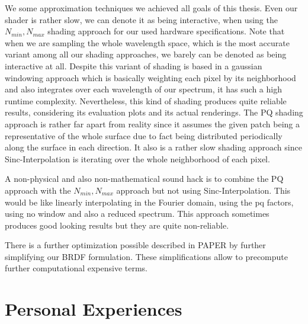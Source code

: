 We some approximation techniques we achieved all goals of this thesis. Even our shader is rather slow, we can denote it as being interactive, when using the $N_{min}, N_{max}$ shading approach for our used hardware specifications. Note that when we are sampling the whole wavelength space, which is the most accurate variant among all our shading approaches, we barely can be denoted as being interactive at all. Despite this variant of shading is based in a gaussian windowing approach which is basically weighting each pixel by its neighborhood and also integrates over each wavelength of our spectrum, it has such a high runtime complexity. Nevertheless, this kind of shading produces quite reliable results, considering its evaluation plots and its actual renderings. The PQ shading approach is rather far apart from reality since it assumes the given patch being a representative of the whole surface due to fact being distributed periodically along the surface in each direction. It also is a rather slow shading approach since Sinc-Interpolation is iterating over the whole neighborhood of each pixel. 

A non-physical and also non-mathematical sound hack is to combine the PQ approach with the $N_{min}, N_{max}$ approach but not using Sinc-Interpolation. This would be like linearly interpolating in the Fourier domain, using the pq factors, using no window and also a reduced spectrum. This approach sometimes produces good looking results but they are quite non-reliable. 

There is a further optimization possible described in PAPER by further simplifying our BRDF formulation. These simplifications allow to precompute further computational expensive terms.  

\section{Personal Experiences}


